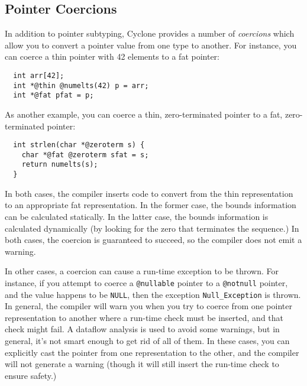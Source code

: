 \subsection{Pointer Coercions}

In addition to pointer subtyping, Cyclone provides a number of
\emph{coercions} which allow you to convert a pointer value from one
type to another.  For instance, you can coerce a thin pointer
with 42 elements to a fat pointer:
\begin{verbatim}
  int arr[42];
  int *@thin @numelts(42) p = arr;
  int *@fat pfat = p;
\end{verbatim}
As another example, you can coerce a thin, zero-terminated pointer
to a fat, zero-terminated pointer:
\begin{verbatim}
  int strlen(char *@zeroterm s) {
    char *@fat @zeroterm sfat = s;
    return numelts(s);
  }
\end{verbatim}
In both cases, the compiler inserts code to convert from the
thin representation to an appropriate fat representation.  In
the former case, the bounds information can be calculated
statically.  In the latter case, the bounds information is
calculated dynamically (by looking for the zero that terminates
the sequence.)  In both cases, the coercion is guaranteed to
succeed, so the compiler does not emit a warning.

In other cases, a coercion can cause a run-time exception to be
thrown.  For instance, if you attempt to coerce a \texttt{@nullable}
pointer to a \texttt{@notnull} pointer, and the value happens to be
\texttt{NULL}, then the exception \texttt{Null_Exception} is thrown.
In general, the compiler will warn you when you try to coerce
from one pointer representation to another where a run-time
check must be inserted, and that check might fail.  A dataflow
analysis is used to avoid some warnings, but in general,
it's not smart enough to get rid of all of them.  In these
cases, you can explicitly cast the pointer from one representation
to the other, and the compiler will not generate a warning
(though it will still insert the run-time check to ensure
safety.)

